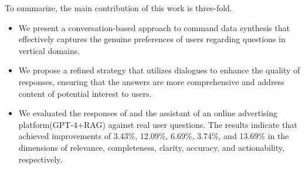 To summarize, the main contribution of this work is three-fold.
\begin{itemize}
    \item We present a conversation-based approach \ourmodel to command data synthesis that effectively captures the genuine preferences of users regarding questions in vertical domains.
    \item We propose a refined strategy that utilizes dialogues to enhance the quality of  responses, ensuring that the answers are more comprehensive and address content of potential interest to users.
    \item We evaluated the responses of \ourmodel and the assistant of an online advertising platform(GPT-4+RAG) against real user questions. The results indicate that \ourmodel achieved improvements of 3.43\%, 12.09\%, 6.69\%, 3.74\%, and 13.69\% in the dimensions of relevance, completeness, clarity, accuracy, and actionability, respectively.
   
\end{itemize}


